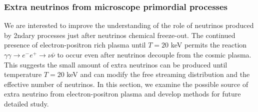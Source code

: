  
\subsubsection{Extra neutrinos from microscope primordial processes}
We are interested to improve the understanding of the role of neutrinos produced by 2ndary processes just after neutrinos chemical freeze-out. The continued presence of electron-positron rich plasma until $T=20$ keV permits the reaction $\gamma\gamma\to e^-e^+\to\nu\bar{\nu}$ to occur even after neutrinos decouple from the cosmic plasma. This suggests the small amount of extra neutrinos can be produced until temperature $T=20$ keV and can modify the free streaming distribution and the effective number of neutrinos. In this section, we examine the possible source of extra neutrino from electron-positron plasma and develop methods for
future detailed study.

